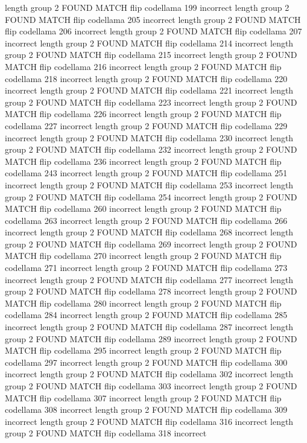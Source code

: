 length group  2
FOUND MATCH flip codellama 199 incorrect
length group  2
FOUND MATCH flip codellama 205 incorrect
length group  2
FOUND MATCH flip codellama 206 incorrect
length group  2
FOUND MATCH flip codellama 207 incorrect
length group  2
FOUND MATCH flip codellama 214 incorrect
length group  2
FOUND MATCH flip codellama 215 incorrect
length group  2
FOUND MATCH flip codellama 216 incorrect
length group  2
FOUND MATCH flip codellama 218 incorrect
length group  2
FOUND MATCH flip codellama 220 incorrect
length group  2
FOUND MATCH flip codellama 221 incorrect
length group  2
FOUND MATCH flip codellama 223 incorrect
length group  2
FOUND MATCH flip codellama 226 incorrect
length group  2
FOUND MATCH flip codellama 227 incorrect
length group  2
FOUND MATCH flip codellama 229 incorrect
length group  2
FOUND MATCH flip codellama 230 incorrect
length group  2
FOUND MATCH flip codellama 232 incorrect
length group  2
FOUND MATCH flip codellama 236 incorrect
length group  2
FOUND MATCH flip codellama 243 incorrect
length group  2
FOUND MATCH flip codellama 251 incorrect
length group  2
FOUND MATCH flip codellama 253 incorrect
length group  2
FOUND MATCH flip codellama 254 incorrect
length group  2
FOUND MATCH flip codellama 260 incorrect
length group  2
FOUND MATCH flip codellama 263 incorrect
length group  2
FOUND MATCH flip codellama 266 incorrect
length group  2
FOUND MATCH flip codellama 268 incorrect
length group  2
FOUND MATCH flip codellama 269 incorrect
length group  2
FOUND MATCH flip codellama 270 incorrect
length group  2
FOUND MATCH flip codellama 271 incorrect
length group  2
FOUND MATCH flip codellama 273 incorrect
length group  2
FOUND MATCH flip codellama 277 incorrect
length group  2
FOUND MATCH flip codellama 278 incorrect
length group  2
FOUND MATCH flip codellama 280 incorrect
length group  2
FOUND MATCH flip codellama 284 incorrect
length group  2
FOUND MATCH flip codellama 285 incorrect
length group  2
FOUND MATCH flip codellama 287 incorrect
length group  2
FOUND MATCH flip codellama 289 incorrect
length group  2
FOUND MATCH flip codellama 295 incorrect
length group  2
FOUND MATCH flip codellama 297 incorrect
length group  2
FOUND MATCH flip codellama 300 incorrect
length group  2
FOUND MATCH flip codellama 302 incorrect
length group  2
FOUND MATCH flip codellama 303 incorrect
length group  2
FOUND MATCH flip codellama 307 incorrect
length group  2
FOUND MATCH flip codellama 308 incorrect
length group  2
FOUND MATCH flip codellama 309 incorrect
length group  2
FOUND MATCH flip codellama 316 incorrect
length group  2
FOUND MATCH flip codellama 318 incorrect
